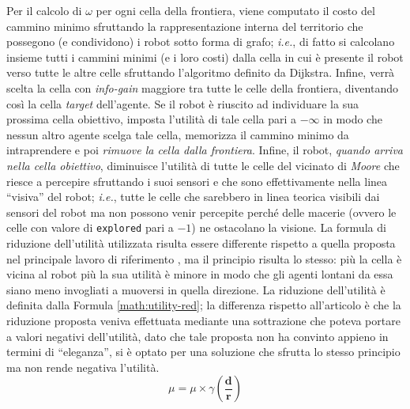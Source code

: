 Per il calcolo di $\omega$ per ogni cella della frontiera, viene computato il costo del cammino minimo sfruttando la rappresentazione interna del territorio che possegono (e condividono) i robot sotto forma di grafo; \textit{i.e.}, di fatto si calcolano insieme tutti i cammini minimi (e i loro costi) dalla cella in cui è presente il robot verso tutte le altre celle sfruttando l'algoritmo definito da Dijkstra.
Infine, verrà scelta la cella con \textit{info-gain} maggiore tra tutte le celle della frontiera, diventando così la cella \textit{target} dell'agente.
Se il robot è riuscito ad individuare la sua prossima cella obiettivo, imposta l'utilità di tale cella pari a $-\infty$ in modo che nessun altro agente scelga tale cella, memorizza il cammino minimo da intraprendere e poi \textit{rimuove la cella dalla frontiera}.
Infine, il robot, \textit{quando arriva nella cella obiettivo}, diminuisce l'utilità di tutte le celle del vicinato di \textit{Moore} che riesce a percepire sfruttando i suoi sensori e che sono effettivamente nella linea “visiva” del robot; \textit{i.e.}, tutte le celle che sarebbero in linea teorica visibili dai sensori del robot ma non possono venir percepite perché delle macerie (ovvero le celle con valore di \texttt{explored} pari a $-1$) ne ostacolano la visione.
La formula di riduzione dell'utilità utilizzata risulta essere differente rispetto a quella proposta nel principale lavoro di riferimento \cite{burgard2005}, ma il principio risulta lo stesso: più la cella è vicina al robot più la sua utilità è minore in modo che gli agenti lontani da essa siano meno invogliati a muoversi in quella direzione.
La riduzione dell'utilità è definita dalla Formula \ref{math:utility-red}; la differenza rispetto all'articolo è che la riduzione proposta veniva effettuata mediante una sottrazione che poteva portare a valori negativi dell'utilità, dato che tale proposta non ha convinto appieno in termini di “eleganza”, si è optato per una soluzione che sfrutta lo stesso principio ma non rende negativa l'utilità. 
\begin{equation}
	\label{math:utility-red}
	\mu = \mu\times\gamma\left(\frac{\textbf{d}}{\textbf{r}}\right)
\end{equation}
